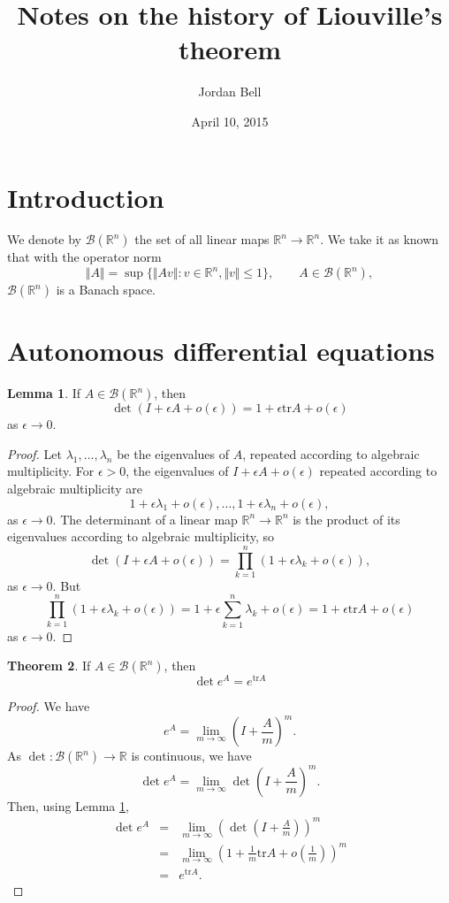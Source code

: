 \documentclass{article}
\newcommand{\tr}{\textrm{tr}}
\newcommand{\norm}[1]{\Vert #1 \Vert}
\theoremstyle{definition}
\newtheorem{theorem}{Theorem}
\newtheorem{lemma}[theorem]{Lemma}
\begin{document}
\title{Notes on the history of Liouville's theorem}
\author{Jordan Bell}
\date{April 10, 2015}

\maketitle

\section{Introduction}
We denote by $\mathscr{B}(\mathbb{R}^n)$ the set of all linear maps $\mathbb{R}^n \to \mathbb{R}^n$. We take it as known
that with the operator norm
\[
\norm{A} = \sup \{\norm{Av}: v\in \mathbb{R}^n, \norm{v} \leq 1\}, \qquad A \in \mathscr{B}(\mathbb{R}^n),
\]
$\mathscr{B}(\mathbb{R}^n)$ is a Banach space.


\section{Autonomous differential equations}
\begin{lemma}
If $A \in \mathscr{B}(\mathbb{R}^n)$, then 
\[
 \det (I+\epsilon A+o(\epsilon))=1+\epsilon \tr A +o(\epsilon)
\]
as $\epsilon \to 0$.
\label{detlemma}
\end{lemma}
\begin{proof}
Let $\lambda_1,\ldots,\lambda_n$ be the eigenvalues of $A$, repeated according
to algebraic multiplicity. For $\epsilon>0$, the eigenvalues of $I+\epsilon A+o(\epsilon)$  repeated according to algebraic multiplicity are
\[
1+\epsilon \lambda_1+o(\epsilon),\ldots,
1+\epsilon \lambda_n+o(\epsilon),
\]
as $\epsilon \to 0$. The determinant of a linear map $\mathbb{R}^n \to \mathbb{R}^n$ is the product of its eigenvalues according to algebraic
 multiplicity, so
 \[
 \det (I+\epsilon A+o(\epsilon)) = \prod_{k=1}^n (1+\epsilon \lambda_k+o(\epsilon)),
 \]
 as $\epsilon \to 0$.
 But
 \[
 \prod_{k=1}^n (1+\epsilon \lambda_k + o(\epsilon)) = 1 + \epsilon \sum_{k=1}^n \lambda_k +o(\epsilon) = 1+\epsilon \tr A +o(\epsilon)
 \]
 as $\epsilon \to 0$.
 \end{proof}
 
 

\begin{theorem}
If $A \in \mathscr{B}(\mathbb{R}^n)$, then
\[
\det e^A = e^{\tr A}
\]
\label{dettheorem}
\end{theorem}
\begin{proof}
We have
\[
e^A=\lim_{m \to \infty} \left(I+\frac{A}{m}\right)^m.
\]
As $\det:\mathscr{B}(\mathbb{R}^n) \to \mathbb{R}$ is continuous, we have
\[
\det e^A = \lim_{m \to \infty} \det  \left(I+\frac{A}{m}\right)^m.
\]
Then, using Lemma \ref{detlemma},
\begin{eqnarray*}
\det e^A&=&\lim_{m \to \infty} \left(\det  \left(I+\frac{A}{m}\right) \right)^m\\
&=&\lim_{m \to \infty} \left( 1+ \frac{1}{m}\tr A + o\left(\frac{1}{m}\right) \right)^m\\
&=&e^{\tr A}.
\end{eqnarray*}
\end{proof}
\end{document}
